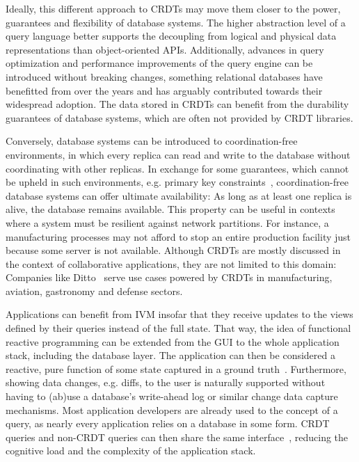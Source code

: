Ideally, this different approach to \acp{CRDT} may move them closer to the power,
guarantees and flexibility of database systems.
The higher abstraction level of a query language better supports the decoupling
from logical and physical data representations than object-oriented \acsp{API}.
Additionally, advances in query optimization and performance improvements
of the query engine can be introduced without breaking changes,
something relational databases have benefitted from over the years and
has arguably contributed towards their widespread adoption.
The data stored in \acp{CRDT} can benefit from the durability guarantees of
database systems, which are often not provided by \ac{CRDT} libraries.


Conversely, database systems can be introduced to coordination-free environments,
in which every replica can read and write to the database without
coordinating with other replicas.
In exchange for some guarantees, which cannot be upheld in such environments,
e.g. primary key constraints~\cite{bailis2014coordination},
coordination-free database systems can offer ultimate availability:
As long as at least one replica is alive, the database remains available.
This property can be useful in contexts where a system must be resilient
against network partitions.
For instance, a manufacturing processes may not afford to stop an entire
production facility just because some server is not available.
Although \acp{CRDT} are mostly discussed in the context of collaborative
applications, they are not limited to this domain:
Companies like Ditto~\cite{ditto} serve use cases powered by \acp{CRDT}
in manufacturing, aviation, gastronomy and defense sectors.

Applications can benefit from \ac{IVM} insofar that they receive updates
to the views defined by their queries instead of the full state.
That way, the idea of functional reactive programming can be extended from
the \acs{GUI} to the whole application stack, including the database layer.
The application can then be considered a reactive, pure function
of some state captured in a ground truth~\cite{litt2023riffle}.
Furthermore, showing data changes, e.g. diffs, to the user is naturally supported
without having to (ab)use a database's write-ahead log or similar change
data capture mechanisms.
Most application developers are already used to the concept of a query,
as nearly every application relies on a database in some form.
\ac{CRDT} queries and non-\ac{CRDT} queries can then share the
same interface~\cite{litt2023riffle},
reducing the cognitive load and the complexity of the application stack.

